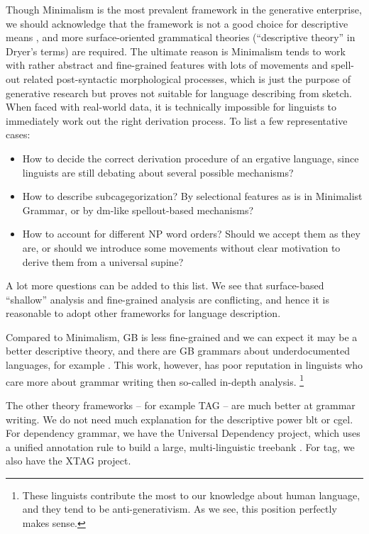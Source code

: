 \documentclass[../main.tex]{subfiles}
\begin{document}
Though Minimalism is the most prevalent framework in the generative enterprise, we should acknowledge that 
the framework is not a good choice for descriptive means \citep{dryer2006descriptive}, and more surface-oriented
grammatical theories (``descriptive theory'' in Dryer's terms) are required. The ultimate reason is 
Minimalism tends to work with rather abstract and fine-grained features with lots of movements and spell-out related post-syntactic morphological processes, 
which is just the purpose of generative research but proves not suitable for language describing from sketch.
When faced with real-world data, it is technically impossible for linguists to immediately work out the right derivation process. To list a few representative cases:
\begin{itemize}
    \item  How to decide the correct derivation procedure of an ergative language, since 
    linguists are still debating about several possible mechanisms?
    \item How to describe subcagegorization? By selectional features as is in Minimalist Grammar,
    or by \ac{dm}-like spellout-based mechanisms\citep{siddiqi2009syntax}?
    \item How to account for different NP word orders? Should we accept them as they are, or should we introduce 
    some movements without clear motivation \citep{cinque2005deriving} to derive them from a universal supine?
\end{itemize}
A lot more questions can be added to this list. We see that surface-based ``shallow'' analysis and fine-grained 
analysis are conflicting, and hence it is reasonable to adopt other frameworks for language description.

Compared to Minimalism, GB is less fine-grained and we can expect it may be a better descriptive theory,
and there are GB grammars about underdocumented languages, for example \citet{holmer1996parametric}. 
This work, however, has poor reputation in linguists who care more about grammar writing then so-called in-depth
analysis.%
\footnote{
    These linguists contribute the most to our knowledge about human language, and they tend to 
    be anti-generativism. As we see, this position perfectly makes sense.
}

The other theory frameworks -- for example TAG -- are much better at grammar writing. We do not need much explanation for 
the descriptive power \ac{blt} or \ac{cgel}. For dependency grammar, we have the Universal Dependency 
project, which uses a unified annotation rule to build a large, multi-linguistic treebank \citep{ud}.
For \ac{tag}, we also have the XTAG project. %
\end{document}
